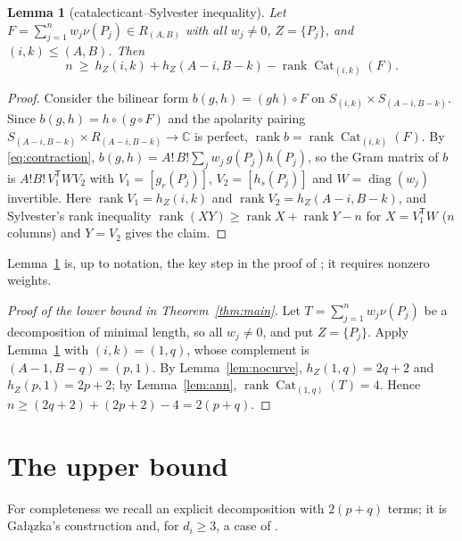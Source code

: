 \documentclass[11pt]{amsart}
\newtheorem{lemma}[theorem]{Lemma}
\theoremstyle{remark}
\newcommand{\C}{\mathbb{C}}
\DeclareMathOperator{\Cat}{Cat}
\DeclareMathOperator{\rank}{rank}
\begin{document}
\begin{lemma}[catalecticant--Sylvester inequality]\label{lem:sylvester}
Let $F=\sum_{j=1}^n w_j\nu(P_j)\in R_{(A,B)}$ with all $w_j\ne0$, $Z=\{P_j\}$, and $(i,k)\le(A,B)$. Then
\[
n\ \ge\ h_Z(i,k)+h_Z(A-i,B-k)-\rank\Cat_{(i,k)}(F).
\]
\end{lemma}
\begin{proof}
Consider the bilinear form $b(g,h)=(gh)\circ F$ on $S_{(i,k)}\times S_{(A-i,B-k)}$. Since $b(g,h)=h\circ(g\circ F)$ and the apolarity pairing $S_{(A-i,B-k)}\times R_{(A-i,B-k)}\to\C$ is perfect, $\rank b=\rank\Cat_{(i,k)}(F)$. By \eqref{eq:contraction}, $b(g,h)=A!\,B!\sum_j w_j\,g(P_j)h(P_j)$, so the Gram matrix of $b$ is $A!B!\,V_1^{\mathsf T}WV_2$ with $V_1=[g_r(P_j)]$, $V_2=[h_s(P_j)]$ and $W=\operatorname{diag}(w_j)$ invertible. Here $\rank V_1=h_Z(i,k)$ and $\rank V_2=h_Z(A-i,B-k)$, and Sylvester's rank inequality $\rank(XY)\ge\rank X+\rank Y-n$ for $X=V_1^{\mathsf T}W$ \textup($n$ columns\textup) and $Y=V_2$ gives the claim.
\end{proof}

Lemma~\ref{lem:sylvester} is, up to notation, the key step in the proof of \cite[Thm.~1.8 and Thm.~3.13]{WS}; it requires nonzero weights.

\begin{proof}[Proof of the lower bound in Theorem~\ref{thm:main}]
Let $T=\sum_{j=1}^n w_j\nu(P_j)$ be a decomposition of minimal length, so all $w_j\ne0$, and put $Z=\{P_j\}$. Apply Lemma~\ref{lem:sylvester} with $(i,k)=(1,q)$, whose complement is $(A-1,B-q)=(p,1)$. By Lemma~\ref{lem:nocurve}, $h_Z(1,q)=2q+2$ and $h_Z(p,1)=2p+2$; by Lemma~\ref{lem:ann}, $\rank\Cat_{(1,q)}(T)=4$. Hence $n\ge(2q+2)+(2p+2)-4=2(p+q)$.
\end{proof}

\section{The upper bound}\label{sec:upper}

For completeness we recall an explicit decomposition with $2(p+q)$ terms; it is Ga{\l}\k{a}zka's construction \cite[Thm.~1.5(i)]{Gal} and, for $d_i\ge3$, a case of \cite[Thm.~1.1]{CCS}.
\end{document}
